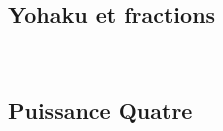 \subsection*{Yohaku et fractions}



 \pagebreak
\subsection*{Puissance Quatre}

\pagebreak

\pagebreak

\pagebreak
